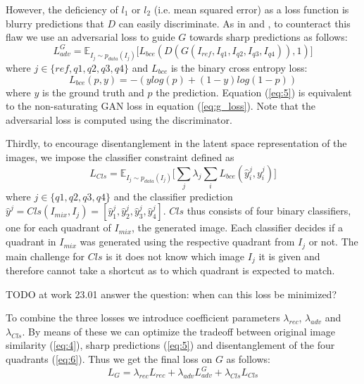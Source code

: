 \documentclass[12pt,a4paper]{article}
\begin{document}
However, the deficiency of $l_1$ or $l_2$ (i.e. mean squared error) as a loss function is blurry predictions that $D$ can easily discriminate. As in \cite{1711.07410} and \cite{1511.05440}, to counteract this flaw we use an adversarial loss to guide $G$ towards sharp predictions as follows:
\begin{equation} \label{eq:5}
    L^G_{adv} = \mathbb{E}_{I_{j}\sim p_{data} (I_{j})}\big[ L_{bce}(D(G(I_{ref},I_{q1},I_{q2},I_{q3},I_{q4})), 1)\big]
\end{equation}
where $j \in \{ref,q1,q2,q3,q4\}$ and $L_{bce}$ is the binary cross entropy loss:
\begin{equation} \label{eq:6}
    L_{bce}(p, y) = -(ylog(p) + (1 - y)log(1-p))
\end{equation}
where $y$ is the ground truth and $p$ the prediction. Equation (\ref{eq:5}) is equivalent to the non-saturating GAN loss in equation (\ref{eq:g_loss}). Note that the adversarial loss is computed using the discriminator.

Thirdly, to encourage disentanglement in the latent space representation of the images, we impose the classifier constraint defined as
\begin{equation} \label{eq:7}
    L_{Cls} = \mathbb{E}_{I_{j}\sim p_{data} (I_{j})}\big[\sum_{j} \lambda_j \sum_{i} L_{bce}(\hat{y}^j_i, y^j_i)\big]
\end{equation}
where $j \in \{q1,q2,q3,q4\}$ and the classifier prediction $\hat{y}^j = Cls(I_{mix}, I_j) = [\hat{y}^j_1, \hat{y}^j_2, \hat{y}^j_3, \hat{y}^j_4]$. $Cls$ thus consists of four binary classifiers, one for each quadrant of $I_{mix}$, the generated image. Each classifier decides if a quadrant in $I_{mix}$ was generated using the respective quadrant from $I_j$ or not. The main challenge for $Cls$ is it does not know which image $I_j$ it is given and therefore cannot take a shortcut as to which quadrant is expected to match.

TODO at work 23.01 answer the question: when can this loss be minimized?


To combine the three losses we introduce coefficient parameters $\lambda_{rec}$, $\lambda_{adv}$ and $\lambda_{Cls}$. By means of these we can optimize the tradeoff between original image similarity (\ref{eq:4}), sharp predictions (\ref{eq:5}) and disentanglement of the four quadrants (\ref{eq:6}). Thus we get the final loss on $G$ as follows:
\begin{equation} \label{eq:g_loss_comp}
    L_{G} = \lambda_{rec} L_{rec} + \lambda_{adv} L^G_{adv} + \lambda_{Cls} L_{Cls}
\end{equation}
\end{document}
